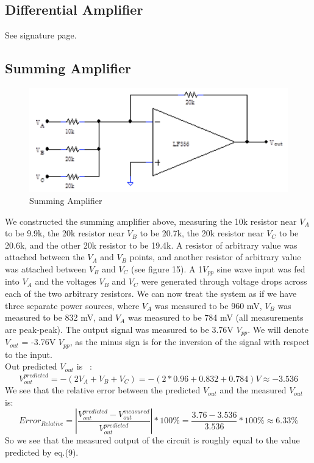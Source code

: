 \documentclass{article}
\begin{document}
\subsection{Differential Amplifier}
    See signature page.
\subsection{Summing Amplifier}
    \begin{figure}[H]
        \centering
        \includegraphics[scale = 0.7]{10.png}
        \caption{Summing Amplifier ~\cite{webfig}}
        \label{fig:my_label}
    \end{figure}
    We constructed the summing amplifier above, measuring the 10k resistor near $V_A$ to be 9.9k, the 20k resistor near $V_B$ to be 20.7k, the 20k resistor near $V_C$ to be 20.6k, and the other 20k resistor to be 19.4k. A resistor of arbitrary value was attached between the $V_A$ and $V_B$ points, and another resistor of arbitrary value was attached between $V_B$ and $V_C$ (see figure 15). A 1$V_{pp}$ sine wave input was fed into $V_A$ and the voltages $V_B$ and $V_C$ were generated through voltage drops across each of the two arbitrary resistors. We can now treat the system as if we have three separate power sources, where $V_A$ was measured to be 960 mV, $V_B$ was measured to be 832 mV, and $V_A$ was measured to be 784 mV (all measurements are peak-peak). The output signal was measured to be 3.76V $V_{pp}$. We will denote $V_{out}$ = -3.76V $V_{pp}$, as the minus sign is for the inversion of the signal with respect to the input.\\\indent Out predicted $V_{out}$ is ~\cite{webfig}:
    \begin{equation}
        V_{out}^{predicted} = -(2V_A + V_B + V_C) = -(2*0.96 + 0.832 +0.784)V \approx -3.536
    \end{equation}
    We see that the relative error between the predicted $V_{out}$ and the measured $V_{out}$ is:
    \begin{equation}
        Error_{Relative} = |\frac{V_{out}^{predicted} - V_{out}^{measured}}{V_{out}^{predicted}}| * 100\% = \frac{3.76-3.536}{3.536} * 100\% \approx 6.33\%
    \end{equation}
    So we see that the measured output of the circuit is roughly equal to the value predicted by eq.(9).
\end{document}
